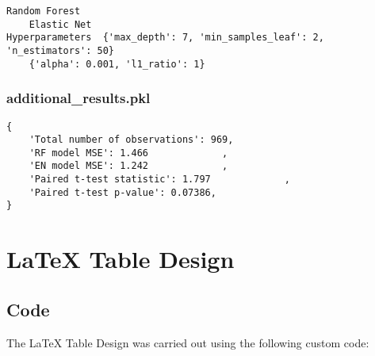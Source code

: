 \documentclass[11pt]{article}
\begin{document}
\begin{Verbatim}[tabsize=4]
                                                               Random Forest
	Elastic Net
Hyperparameters  {'max_depth': 7, 'min_samples_leaf': 2, 'n_estimators': 50}
	{'alpha': 0.001, 'l1_ratio': 1}
\end{Verbatim}

\subsubsection*{additional\_results.pkl}

\begin{Verbatim}[tabsize=4]
{
    'Total number of observations': 969,
    'RF model MSE': 1.466             ,
    'EN model MSE': 1.242             ,
    'Paired t-test statistic': 1.797             ,
    'Paired t-test p-value': 0.07386,
}
\end{Verbatim}

\section{LaTeX Table Design}
\subsection{{Code}}
The LaTeX Table Design was carried out using the following custom code:
\end{document}
